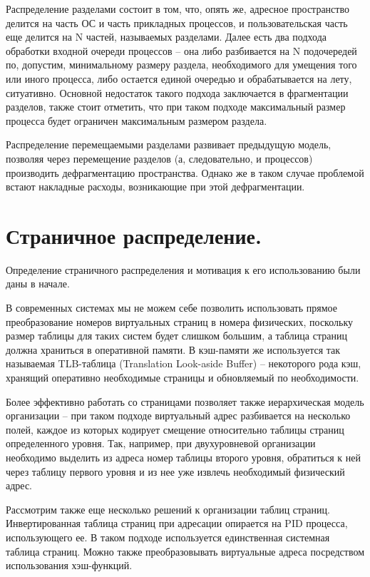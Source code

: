 \documentclass[a4paper,12pt,titlepage,finall]{article}
\begin{document}
Распределение разделами состоит в том, что, опять же, адресное пространство делится на часть ОС и часть прикладных процессов, и пользовательская часть еще делится на N частей, называемых разделами. Далее есть два подхода обработки входной очереди процессов -- она либо разбивается на N подочередей по, допустим, минимальному размеру раздела, необходимого для умещения того или иного процесса, либо остается единой очередью и обрабатывается на лету, ситуативно. Основной недостаток такого подхода заключается в фрагментации разделов, также стоит отметить, что при таком подходе максимальный размер процесса будет ограничен максимальным размером раздела.

Распределение перемещаемыми разделами развивает предыдущую модель, позволяя через перемещение разделов (а, следовательно, и процессов) производить дефрагментацию пространства. Однако же в таком случае проблемой встают накладные расходы, возникающие при этой дефрагментации.

\section{Страничное распределение.}
Определение страничного распределения и мотивация к его использованию были даны в начале.

В современных системах мы не можем себе позволить использовать прямое преобразование номеров виртуальных страниц в номера физических, поскольку размер таблицы для таких систем будет слишком большим, а таблица страниц должна храниться в оперативной памяти. В кэш-памяти же используется так называемая TLB-таблица (Translation Look-aside Buffer) -- некоторого рода кэш, хранящий оперативно необходимые страницы и обновляемый по необходимости.

Более эффективно работать со страницами позволяет также иерархическая модель организации -- при таком подходе виртуальный адрес разбивается на несколько полей, каждое из которых кодирует смещение относительно таблицы страниц определенного уровня. Так, например, при двухуровневой организации необходимо выделить из адреса номер таблицы второго уровня, обратиться к ней через таблицу первого уровня и из нее уже извлечь необходимый физический адрес.

Рассмотрим также еще несколько решений к организации таблиц страниц. Инвертированная таблица страниц при адресации опирается на PID процесса, использующего ее. В таком подходе используется единственная системная таблица страниц. Можно также преобразовывать виртуальные адреса посредством использования хэш-функций.
\end{document}
